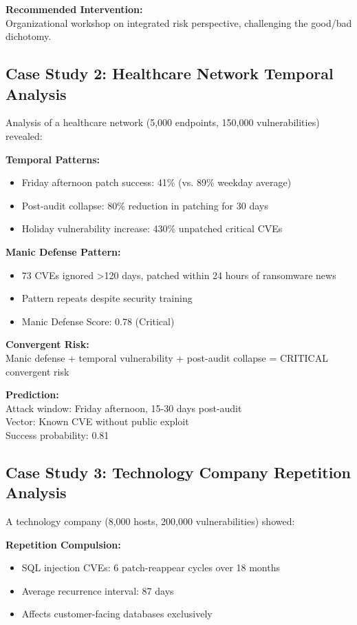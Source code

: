 \documentclass[11pt,a4paper]{article}
\begin{document}
\textbf{Recommended Intervention:}\\
Organizational workshop on integrated risk perspective, challenging the good/bad dichotomy.

\subsection{Case Study 2: Healthcare Network Temporal Analysis}

Analysis of a healthcare network (5,000 endpoints, 150,000 vulnerabilities) revealed:

\textbf{Temporal Patterns:}
\begin{itemize}
\item Friday afternoon patch success: 41\% (vs. 89\% weekday average)
\item Post-audit collapse: 80\% reduction in patching for 30 days
\item Holiday vulnerability increase: 430\% unpatched critical CVEs
\end{itemize}

\textbf{Manic Defense Pattern:}
\begin{itemize}
\item 73 CVEs ignored >120 days, patched within 24 hours of ransomware news
\item Pattern repeats despite security training
\item Manic Defense Score: 0.78 (Critical)
\end{itemize}

\textbf{Convergent Risk:}\\
Manic defense + temporal vulnerability + post-audit collapse = CRITICAL convergent risk

\textbf{Prediction:}\\
Attack window: Friday afternoon, 15-30 days post-audit\\
Vector: Known CVE without public exploit\\
Success probability: 0.81

\subsection{Case Study 3: Technology Company Repetition Analysis}

A technology company (8,000 hosts, 200,000 vulnerabilities) showed:

\textbf{Repetition Compulsion:}
\begin{itemize}
\item SQL injection CVEs: 6 patch-reappear cycles over 18 months
\item Average recurrence interval: 87 days
\item Affects customer-facing databases exclusively
\end{itemize}
\end{document}
